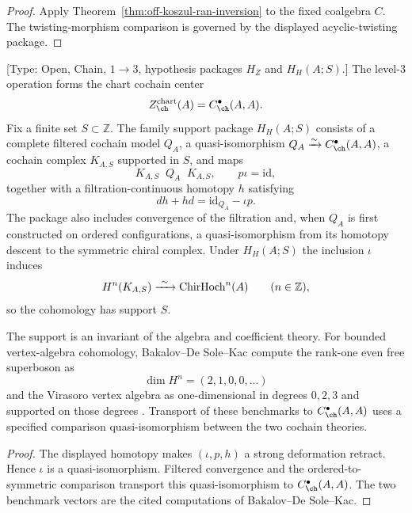 \begin{proof}
Apply Theorem~\ref{thm:off-koszul-ran-inversion} to the fixed
coalgebra $C$.  The twisting-morphism comparison is governed by the
displayed acyclic-twisting package.
\end{proof}

\begin{theorem}
\label{thm:mr-H}
\textup{[Type: Open, Chain, $1\rightarrow 3$, hypothesis packages
$H_Z$ and $H_H(A;S)$.]}
The level-$3$ operation forms the chart cochain center
\[
 Z_{\ch}^{\mathrm{chart}}(A)
 =C^\bullet_{\ch}(A,A).
\]
Fix a finite set $S\subset\mathbb Z$.  The family support package
$H_H(A;S)$ consists of a complete filtered cochain model $Q_A$, a
quasi-isomorphism $Q_A\xrightarrow{\sim}C^\bullet_{\ch}(A,A)$, a
cochain complex $K_{A,S}$ supported in $S$, and maps
\[
 K_{A,S}\mathop{\xrightarrow{\ \iota\ }}
 Q_A\mathop{\xrightarrow{\ p\ }}K_{A,S},
 \qquad p\iota=\mathrm{id},
\]
together with a filtration-continuous homotopy $h$ satisfying
\[
 dh+hd=\mathrm{id}_{Q_A}-\iota p.
\]
The package also includes convergence of the filtration and, when
$Q_A$ is first constructed on ordered configurations, a
quasi-isomorphism from its homotopy descent to the symmetric chiral
complex.  Under $H_H(A;S)$ the inclusion $\iota$ induces
\[
 H^n(K_{A,S})\xrightarrow{\ \sim\ }
 \mathrm{ChirHoch}^n(A)
 \qquad(n\in\mathbb Z),
\]
so the cohomology has support $S$.

The support is an invariant of the algebra and coefficient theory.
For bounded vertex-algebra cohomology, Bakalov--De Sole--Kac compute
the rank-one even free superboson as
\[
 \dim H^n=(2,1,0,0,\ldots)
\]
and the Virasoro vertex algebra as one-dimensional in degrees
$0,2,3$ and supported on those degrees
\cite[Theorems~7.4 and~7.2]{BDSK21}.  Transport of these benchmarks to
$C^\bullet_{\ch}(A,A)$ uses a specified comparison quasi-isomorphism
between the two cochain theories.
\end{theorem}

\begin{proof}
The displayed homotopy makes $(\iota,p,h)$ a strong deformation
retract.  Hence $\iota$ is a quasi-isomorphism.  Filtered convergence
and the ordered-to-symmetric comparison transport this
quasi-isomorphism to $C^\bullet_{\ch}(A,A)$.  The two benchmark vectors
are the cited computations of Bakalov--De Sole--Kac.
\end{proof}

